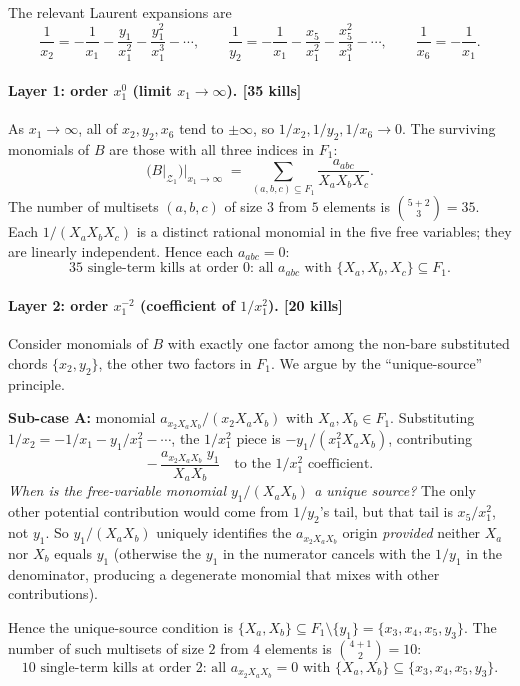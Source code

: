 \documentclass[11pt]{article}
\newcommand{\Zr}{\mathcal{Z}}
\newcommand{\Fr}{F}
\begin{document}
The relevant Laurent expansions are
\[
\frac{1}{x_2} = -\frac{1}{x_1} - \frac{y_1}{x_1^2} - \frac{y_1^2}{x_1^3} - \cdots,
\qquad
\frac{1}{y_2} = -\frac{1}{x_1} - \frac{x_5}{x_1^2} - \frac{x_5^2}{x_1^3} - \cdots,
\qquad
\frac{1}{x_6} = -\frac{1}{x_1}.
\]

\paragraph{Layer 1: order $x_1^0$ (limit $x_1 \to \infty$). [35 kills]}
As $x_1 \to \infty$, all of $x_2, y_2, x_6$ tend to $\pm\infty$, so
$1/x_2, 1/y_2, 1/x_6 \to 0$. The surviving monomials of $B$ are those
with all three indices in $\Fr_1$:
\[
\big(B|_{\Zr_1}\big)\big|_{x_1 \to \infty}
\;=\; \sum_{(a,b,c) \subseteq \Fr_1} \frac{a_{abc}}{X_a X_b X_c}.
\]
The number of multisets $(a,b,c)$ of size $3$ from $5$ elements is
$\binom{5+2}{3} = 35$. Each $1/(X_a X_b X_c)$ is a distinct rational
monomial in the five free variables; they are linearly independent.
Hence each $a_{abc} = 0$:
\[
\boxed{\text{$35$ single-term kills at order $0$: all $a_{abc}$ with $\{X_a, X_b, X_c\} \subseteq \Fr_1$.}}
\]

\paragraph{Layer 2: order $x_1^{-2}$ (coefficient of $1/x_1^2$). [20 kills]}
Consider monomials of $B$ with exactly one factor among the non-bare
substituted chords $\{x_2, y_2\}$, the other two factors in $\Fr_1$.
We argue by the ``unique-source'' principle.

\smallskip
\noindent\textbf{Sub-case A:} monomial
$a_{x_2 X_a X_b}/(x_2 X_a X_b)$ with $X_a, X_b \in \Fr_1$.
Substituting $1/x_2 = -1/x_1 - y_1/x_1^2 - \cdots$, the $1/x_1^2$ piece
is $-y_1/(x_1^2 X_a X_b)$, contributing
\[
-\,\frac{a_{x_2 X_a X_b}\; y_1}{X_a X_b} \quad \text{to the $1/x_1^2$ coefficient.}
\]
\emph{When is the free-variable monomial $y_1/(X_a X_b)$ a unique
source?} The only other potential contribution would come from
$1/y_2$'s tail, but that tail is $x_5/x_1^2$, not $y_1$. So
$y_1/(X_a X_b)$ uniquely identifies the $a_{x_2 X_a X_b}$ origin
\emph{provided} neither $X_a$ nor $X_b$ equals $y_1$ (otherwise the
$y_1$ in the numerator cancels with the $1/y_1$ in the denominator,
producing a degenerate monomial that mixes with other contributions).

Hence the unique-source condition is
$\{X_a, X_b\} \subseteq \Fr_1 \setminus \{y_1\} = \{x_3, x_4, x_5, y_3\}$.
The number of such multisets of size $2$ from $4$ elements is
$\binom{4+1}{2} = 10$:
\[
\boxed{\text{$10$ single-term kills at order $2$: all $a_{x_2 X_a X_b} = 0$ with $\{X_a, X_b\} \subseteq \{x_3, x_4, x_5, y_3\}$.}}
\]
\end{document}
